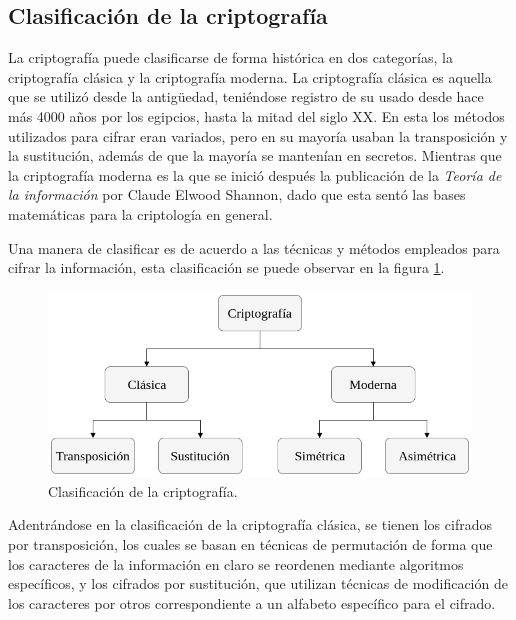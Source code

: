 
\subsection{Clasificación de la criptografía}

  La criptografía puede clasificarse de forma histórica en dos categorías,
  la criptografía clásica y la criptografía moderna. La criptografía clásica
  es aquella que se utilizó desde la antigüedad, teniéndose registro de su
  usado desde hace más 4000 años por los egipcios, hasta la mitad del siglo
  XX. En esta los métodos utilizados para cifrar eran variados, pero en su
  mayoría usaban la transposición y la sustitución, además de que la mayoría
  se mantenían en secretos. Mientras que la criptografía moderna es la que
  se inició después la publicación de la \textit{Teoría de la información}
  por Claude Elwood Shannon, dado que esta sentó las bases matemáticas para
  la criptología en general.

  Una manera de clasificar es de acuerdo a las técnicas y métodos empleados
  para cifrar la información, esta clasificación se puede observar en la
  figura \ref{clasificacion_cripto}.

  \begin{figure}[H]
    \begin{center}
      \includegraphics[width=0.75\linewidth]
        {contenidos/antecedentes/intro/img/clasificacion_cripto.png}
      \caption{Clasificación de la criptografía.}
      \label{clasificacion_cripto}
    \end{center}
  \end{figure}

  Adentrándose en la clasificación de la criptografía clásica, se tienen los
  cifrados por transposición, los cuales se basan en técnicas de permutación
  de forma que los caracteres de la información en claro se reordenen
  mediante algoritmos específicos, y los cifrados por sustitución, que
  utilizan técnicas de modificación de los caracteres por otros
  correspondiente a un alfabeto específico para el cifrado.

